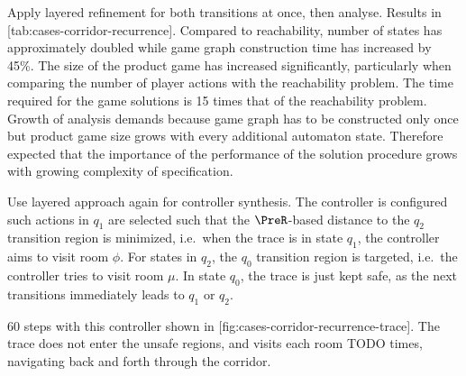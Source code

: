     Apply layered refinement for both transitions at once, then analyse.
    Results in [tab:cases-corridor-recurrence].
    Compared to reachability, number of states has approximately doubled while game graph construction time has increased by 45\%.
    The size of the product game has increased significantly, particularly when comparing the number of player actions with the reachability problem.
    The time required for the game solutions is 15 times that of the reachability problem.
    Growth of analysis demands because game graph has to be constructed only once but product game size grows with every additional automaton state.
    Therefore expected that the importance of the performance of the solution procedure grows with growing complexity of specification.
    
    Use layered approach again for controller synthesis.
    The controller is configured such actions in $q_1$ are selected such that the $\PreR$-based distance to the $q_2$ transition region is minimized, i.e.\ when the trace is in state $q_1$, the controller aims to visit room $\phi$.
    For states in $q_2$, the $q_0$ transition region is targeted, i.e.\ the controller tries to visit room $\mu$.
    In state $q_0$, the trace is just kept safe, as the next transitions immediately leads to $q_1$ or $q_2$.

    60 steps with this controller shown in [fig:cases-corridor-recurrence-trace].
    The trace does not enter the unsafe regions, and visits each room TODO times, navigating back and forth through the corridor.


\stopsubsection

